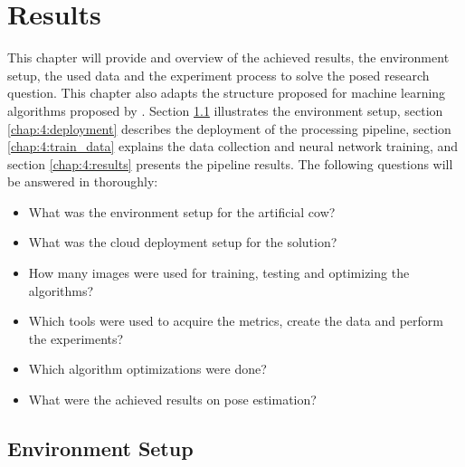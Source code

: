 
\chapter{Results}\label{chap:evaluation}


    
This chapter will provide and overview of the achieved results, the environment setup, the used data and the experiment process to solve the posed research question. 
This chapter also adapts the structure proposed for machine learning algorithms proposed by \textcite{luckert2016using}.
Section \ref{chap:4:setup} illustrates the environment setup, 
section \ref{chap:4:deployment} describes the deployment of the processing pipeline, 
section \ref{chap:4:train_data} explains the data collection and neural network training, 
and section \ref{chap:4:results} presents the pipeline results. The following questions will be answered in thoroughly:
\begin{itemize}
    \item What was the environment setup for the artificial cow?
    \item What was the cloud deployment setup for the solution?
    \item How many images were used for training, testing and optimizing the algorithms?
    \item Which tools were used to acquire the metrics, create the data and perform the experiments?
    \item Which algorithm optimizations were done?
    \item What were the achieved results on pose estimation?
\end{itemize}

\section{Environment Setup}\label{chap:4:setup}


